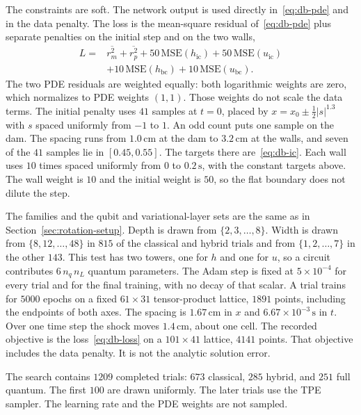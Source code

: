 \documentclass[11pt]{article}
\begin{document}
The constraints are soft. The network output is used directly in~\eqref{eq:db-pde} and in the data penalty. The loss is the mean-square residual of~\eqref{eq:db-pde} plus separate penalties on the initial step and on the two walls,
\begin{equation}
\label{eq:db-loss}
\begin{aligned}
L={}&
\overline{r_{m}^{2}}+\overline{r_{p}^{2}}
+50\,\mathrm{MSE}(h_{\mathrm{ic}})+50\,\mathrm{MSE}(u_{\mathrm{ic}})\\
&+10\,\mathrm{MSE}(h_{\mathrm{bc}})+10\,\mathrm{MSE}(u_{\mathrm{bc}}).
\end{aligned}
\end{equation}
The two PDE residuals are weighted equally: both logarithmic weights are zero, which normalizes to PDE weights \((1,1)\). Those weights do not scale the data terms. The initial penalty uses \(41\) samples at \(t=0\), placed by \(x=x_{0}\pm\tfrac12|s|^{1.3}\) with \(s\) spaced uniformly from \(-1\) to \(1\). An odd count puts one sample on the dam. The spacing runs from \(1.0\,\mathrm{cm}\) at the dam to \(3.2\,\mathrm{cm}\) at the walls, and seven of the \(41\) samples lie in \([0.45,0.55]\). The targets there are~\eqref{eq:db-ic}. Each wall uses \(10\) times spaced uniformly from \(0\) to \(0.2\,\mathrm{s}\), with the constant targets above. The wall weight is \(10\) and the initial weight is \(50\), so the flat boundary does not dilute the step.

The families and the qubit and variational-layer sets are the same as in Section~\ref{sec:rotation-setup}. Depth is drawn from \(\{2,3,\ldots,8\}\). Width is drawn from \(\{8,12,\ldots,48\}\) in \(815\) of the classical and hybrid trials and from \(\{1,2,\ldots,7\}\) in the other \(143\). This test has two towers, one for \(h\) and one for \(u\), so a circuit contributes \(6\,n_{q}\,n_{L}\) quantum parameters. The Adam step is fixed at \(5\times 10^{-4}\) for every trial and for the final training, with no decay of that scalar. A trial trains for \(5000\) epochs on a fixed \(61\times 31\) tensor-product lattice, \(1891\) points, including the endpoints of both axes. The spacing is \(1.67\,\mathrm{cm}\) in \(x\) and \(6.67\times 10^{-3}\,\mathrm{s}\) in \(t\). Over one time step the shock moves \(1.4\,\mathrm{cm}\), about one cell. The recorded objective is the loss~\eqref{eq:db-loss} on a \(101\times 41\) lattice, \(4141\) points. That objective includes the data penalty. It is not the analytic solution error.

The search contains \(1209\) completed trials: \(673\) classical, \(285\) hybrid, and \(251\) full quantum. The first \(100\) are drawn uniformly. The later trials use the TPE sampler. The learning rate and the PDE weights are not sampled.
\end{document}
